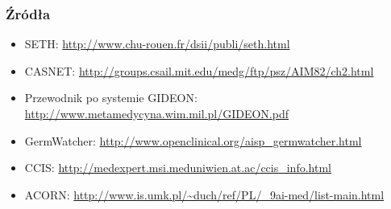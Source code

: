 
\begin{frame}
    \frametitle{Źródła}
    \begin{itemize}
        \item SETH: \url{http://www.chu-rouen.fr/dsii/publi/seth.html}
        \item CASNET: \url{http://groups.csail.mit.edu/medg/ftp/psz/AIM82/ch2.html}
        \item Przewodnik po systemie GIDEON:
        \url{http://www.metamedycyna.wim.mil.pl/GIDEON.pdf}
        \item GermWatcher: \url{http://www.openclinical.org/aisp_germwatcher.html}
        \item CCIS: \url{http://medexpert.msi.meduniwien.at.ac/ccis_info.html}
        \item ACORN: \url{http://www.is.umk.pl/~duch/ref/PL/_9ai-med/list-main.html}
    \end{itemize}
\end{frame}


